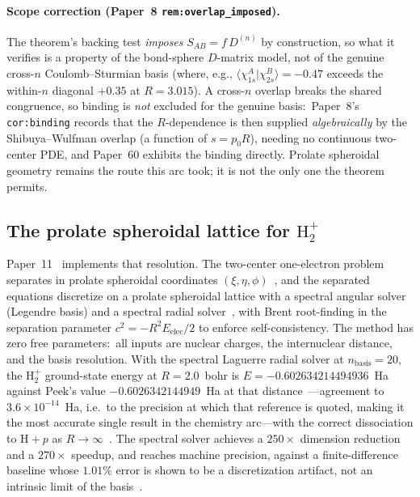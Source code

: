 \documentclass[aps,pra,twocolumn,superscriptaddress,longbibliography]{revtex4-2}
\begin{document}
\paragraph{Scope correction (Paper~8 \texttt{rem:overlap\_imposed}).}
The theorem's backing test \emph{imposes} $S_{AB}=f\,D^{(n)}$ by
construction, so what it verifies is a property of the bond-sphere
$D$-matrix model, not of the genuine cross-$n$ Coulomb--Sturmian basis
(where, e.g., $\langle\chi^A_{1s}|\chi^B_{2s}\rangle=-0.47$ exceeds the
within-$n$ diagonal $+0.35$ at $R=3.015$).  A cross-$n$ overlap breaks the
shared congruence, so binding is \emph{not} excluded for the genuine
basis:\ Paper~8's \texttt{cor:binding} records that the $R$-dependence is
then supplied \emph{algebraically} by the Shibuya--Wulfman overlap
(a function of $s=p_0R$), needing no continuous two-center PDE, and
Paper~60 exhibits the binding directly.  Prolate spheroidal geometry
remains the route this arc took; it is not the only one the theorem
permits.

\subsection{The prolate spheroidal lattice for $\mathrm{H}_2^+$}

Paper~11~\cite{loutey_paper11} implements that resolution.  The
two-center one-electron problem separates in prolate spheroidal
coordinates $(\xi, \eta, \phi)$~\cite{flammer1957}, and the separated equations
discretize on a prolate spheroidal lattice with a spectral angular
solver (Legendre basis) and a spectral radial solver~\cite{trefethen2000}, with Brent
root-finding in the separation parameter $c^2 = -R^2 E_{\mathrm{elec}}/2$
to enforce self-consistency.  The method has zero free parameters:\ all
inputs are nuclear charges, the internuclear distance, and the basis
resolution.  With the spectral Laguerre radial solver at
$n_{\mathrm{basis}} = 20$, the $\mathrm{H}_2^+$ ground-state energy at
$R = 2.0$~bohr is $E = -0.602634214494936$~Ha against Peek's value
$-0.6026342144949$~Ha at that distance~\cite{peek1965}---agreement to
$3.6\times10^{-14}$~Ha, i.e.\ to the precision at which that reference
is quoted, making it the most accurate single result in the chemistry
arc---with the correct dissociation to $\mathrm{H}+p$ as
$R \to \infty$~\cite{loutey_paper11}.  The spectral solver achieves a
$250\times$ dimension reduction and a $270\times$ speedup, and reaches
machine precision, against a finite-difference baseline
whose $1.01\%$ error is shown to be a discretization artifact, not an
intrinsic limit of the basis~\cite{loutey_paper11}.
\end{document}
